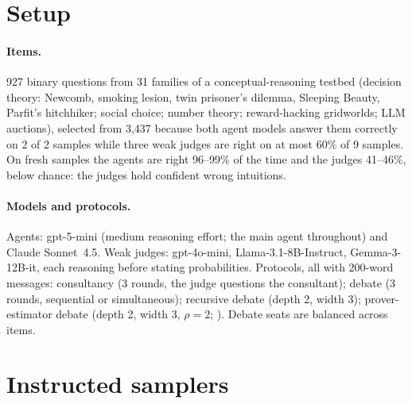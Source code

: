 \documentclass[11pt]{article}
\begin{document}
\section{Setup}\label{sec:setup}

\paragraph{Items.} 927 binary questions from 31 families of a conceptual-reasoning testbed (decision theory:
Newcomb, smoking lesion, twin prisoner's dilemma, Sleeping Beauty, Parfit's hitchhiker; social choice; number
theory; reward-hacking gridworlds; LLM auctions), selected from 3{,}437 because both agent models answer them
correctly on 2 of 2 samples while three weak judges are right on at most 60\% of 9 samples. On fresh samples the
agents are right 96--99\% of the time and the judges 41--46\%, below chance: the judges hold confident wrong
intuitions.

\paragraph{Models and protocols.} Agents: gpt-5-mini (medium reasoning effort; the main agent throughout) and Claude
Sonnet~4.5. Weak judges: gpt-4o-mini, Llama-3.1-8B-Instruct, Gemma-3-12B-it, each reasoning before stating
probabilities. Protocols, all with 200-word messages: consultancy (3 rounds, the judge questions the consultant);
debate (3 rounds, sequential or simultaneous); recursive debate (depth 2, width 3); prover-estimator debate (depth
2, width 3, $\rho = 2$; \citet{browncohen2025prover}). Debate seats are balanced across items.

\section{Instructed samplers}\label{sec:samplers}
\end{document}
